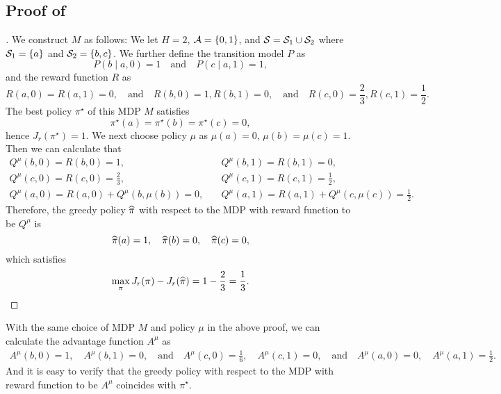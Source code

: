 \documentclass{article}
\begin{document}
\subsection{Proof of }
\begin{proof}[]
    We construct $M$ as follows: We let $H = 2$, $\mathcal{A} = \{0, 1\}$, and $\mathcal{S} = \mathcal{S}_1\cup \mathcal{S}_2$ where $\mathcal{S}_1 = \{a\}$ and $\mathcal{S}_2 = \{b, c\}$. We further define the transition model $P$ as
    $$P(b \mid a, 0) = 1\quad\text{and}\quad P(c\mid a, 1) = 1,$$
    and the reward function $R$ as 
    $$R(a, 0) = R(a, 1) = 0,\quad\text{and}\quad  R(b, 0) = 1, R(b, 1) = 0,\quad \text{and}\quad R(c, 0) = \frac{2}{3}, R(c, 1) = \frac{1}{2}.$$
    The best policy $\pi^\star$ of this MDP $M$ satisfies
    $$\pi^\star(a) = \pi^\star(b) = \pi^\star(c) = 0,$$
    hence $J_r(\pi^\star) = 1$. We next choose policy $\mu$ as $\mu(a) = 0$, $\mu(b) = \mu(c) = 1$. Then we can calculate that 
    \begin{align*}
        Q^\mu(b, 0) = R(b, 0) = 1, & \quad  Q^\mu(b, 1) = R(b, 1) = 0,\\
        Q^\mu(c, 0) = R(c, 0) = \frac{2}{3}, & \quad Q^\mu(c, 1) = R(c, 1) = \frac{1}{2},\\
        Q^\mu(a, 0) = R(a, 0) + Q^\mu(b, \mu(b)) = 0,&\quad Q^\mu(a, 1) = R(a, 1) + Q^\mu(c, \mu(c)) = \frac{1}{2}.
    \end{align*}
    Therefore, the greedy policy $\widehat{\pi}$ with respect to the MDP with reward function to be $Q^\mu$ is 
    $$\widehat{\pi}(a) = 1, \quad \widehat{\pi}(b) = 0,\quad \widehat{\pi}(c) = 0,$$
    which satisfies 
    $$\max_{\pi}J_r(\pi) - J_r(\widehat{\pi}) = 1 - \frac{2}{3} = \frac{1}{3}.$$
\end{proof}
\begin{remark}
    With the same choice of MDP $M$ and policy $\mu$ in the above proof, we can calculate the advantage function $A^\mu$ as  
    \begin{align*}
        A^\mu(b, 0) = 1, \quad  A^\mu(b, 1) = 0,\quad \text{and}\quad A^\mu(c, 0) = \frac{1}{6}, \quad A^\mu(c, 1) = 0,\quad \text{and}\quad 
        A^\mu(a, 0)  = 0,\quad A^\mu(a, 1) = \frac{1}{2}.
    \end{align*}
    And it is easy to verify that the greedy policy with respect to the MDP with reward function to be $A^\mu$ coincides with $\pi^\star$. 
\end{remark}
\end{document}
